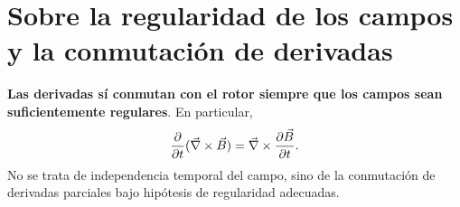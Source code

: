 \documentclass[../main.tex]{subfiles}
\begin{document}
\section{Sobre la regularidad de los campos y la conmutación de derivadas}

\textbf{Las derivadas sí conmutan con el rotor siempre que los campos sean suficientemente regulares}. En particular,
\begin{equation}
    \frac{\partial}{\partial t}(\vec\nabla\times\vec{B})=\vec\nabla\times\frac{\partial\vec{B}}{\partial t}.
    \label{eq:conmutacion-rotor-tiempo}
\end{equation}
No se trata de independencia temporal del campo, sino de la conmutación de derivadas parciales bajo hipótesis de regularidad adecuadas.

\newpage
\end{document}
